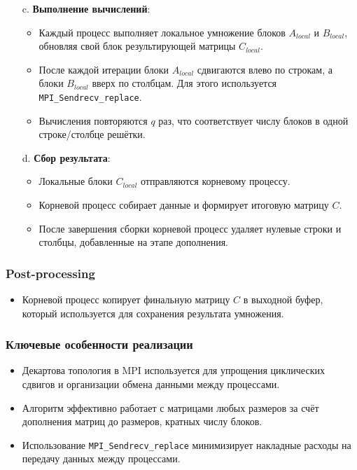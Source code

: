 \documentclass[12pt]{article}
\begin{document}
\begin{enumerate}
\begin{enumerate}
        \item[c.] \textbf{Выполнение вычислений}:
        \begin{itemize}
            \item Каждый процесс выполняет локальное умножение блоков $A_{local}$ и $B_{local}$, обновляя свой блок результирующей матрицы $C_{local}$.
            \item После каждой итерации блоки $A_{local}$ сдвигаются влево по строкам, а блоки $B_{local}$ вверх по столбцам. Для этого используется \texttt{MPI\_Sendrecv\_replace}.
            \item Вычисления повторяются $q$ раз, что соответствует числу блоков в одной строке/столбце решётки.
        \end{itemize}

        \item[d.] \textbf{Сбор результата}:
        \begin{itemize}
            \item Локальные блоки $C_{local}$ отправляются корневому процессу.
            \item Корневой процесс собирает данные и формирует итоговую матрицу $C$.
            \item После завершения сборки корневой процесс удаляет нулевые строки и столбцы, добавленные на этапе дополнения.
        \end{itemize}
    \end{enumerate}
\end{enumerate}


\subsubsection*{Post-processing}
\begin{itemize}
    \item Корневой процесс копирует финальную матрицу $C$ в выходной буфер, который используется для сохранения результата умножения.
\end{itemize}

\subsubsection*{Ключевые особенности реализации}
\begin{itemize}
    \item Декартова топология в MPI используется для упрощения циклических сдвигов и организации обмена данными между процессами.
    \item Алгоритм эффективно работает с матрицами любых размеров за счёт дополнения матриц до размеров, кратных числу блоков.
    \item Использование \texttt{MPI\_Sendrecv\_replace} минимизирует накладные расходы на передачу данных между процессами.
\end{itemize}
\end{document}
